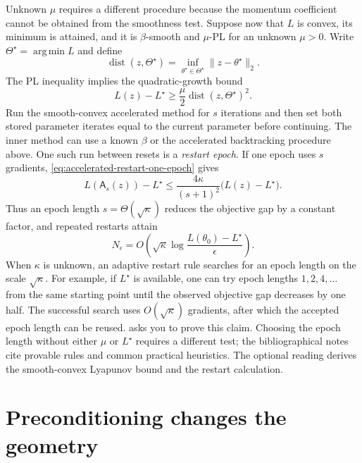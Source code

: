 \documentclass[11pt,twoside]{article}
\newcommand{\argmin}{\operatorname*{arg\,min}}
\theoremstyle{definition}
\theoremstyle{remark}
\begin{document}
Unknown $\mu$ requires a different procedure because the momentum coefficient
cannot be obtained from the smoothness test. Suppose now that $L$ is convex,
its minimum is attained, and it is $\beta$-smooth and $\mu$-PL for an unknown
$\mu>0$. Write $\Theta^\star=\argmin L$ and define
\begin{equation}
 \operatorname{dist}(z,\Theta^\star)
 =\inf_{\theta^\star\in\Theta^\star}\|z-\theta^\star\|_2.
 \label{eq:distance-to-minimizers}
\end{equation}
The PL inequality implies the quadratic-growth bound
\begin{equation}
 L(z)-L^\star
 \ge\frac\mu2\operatorname{dist}(z,\Theta^\star)^2.
 \label{eq:pl-quadratic-growth}
\end{equation}
Run the smooth-convex accelerated method for $s$ iterations and then set both
stored parameter iterates equal to the current parameter before continuing.
The inner method can use a known $\beta$ or the accelerated backtracking
procedure above.
One such run between resets is a \emph{restart epoch}. If one epoch uses $s$
gradients,
\cref{eq:accelerated-restart-one-epoch} gives
\begin{equation}
 L(\mathsf A_s(z))-L^\star
 \le\frac{4\kappa}{(s+1)^2}\bigl(L(z)-L^\star\bigr).
 \label{eq:accelerated-restart-main}
\end{equation}
Thus an epoch length $s=\Theta(\sqrt\kappa)$ reduces the objective gap by a
constant factor, and repeated restarts attain
\begin{equation}
 N_\epsilon
 =O\left(\sqrt\kappa
 \log\frac{L(\theta_0)-L^\star}{\epsilon}\right).
 \label{eq:accelerated-restart-main-complexity}
\end{equation}
When $\kappa$ is unknown, an adaptive restart rule searches for an epoch
length on the scale $\sqrt\kappa$. For example, if $L^\star$ is available,
one can try epoch lengths $1,2,4,\ldots$ from the same starting point until
the observed objective gap decreases by one half. The successful search uses
$O(\sqrt\kappa)$ gradients, after which the accepted epoch length can be
reused.  asks you to prove this claim. Choosing
the epoch length without either $\mu$ or $L^\star$ requires a different test;
the bibliographical notes cite provable rules and common practical heuristics.
The optional reading derives the smooth-convex Lyapunov bound and the restart
calculation.

\section{Preconditioning changes the geometry}
\label{sec:preconditioning}
\end{document}
